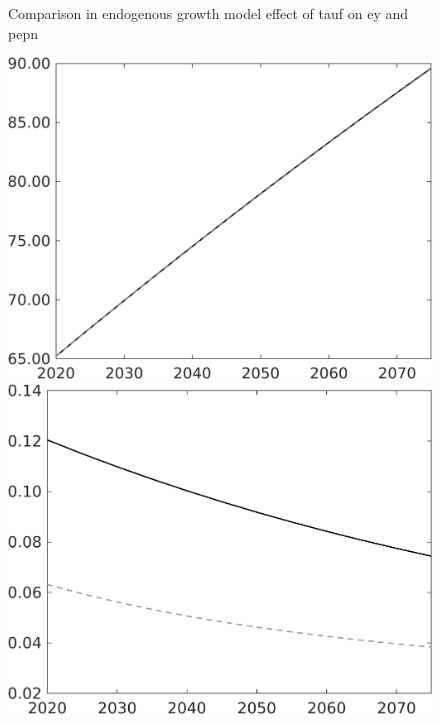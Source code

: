 \documentclass[12pt]{article}
\begin{document}
\begin{figure}{Comparison in endogenous growth model effect of tauf on ey and pepn }
\begin{minipage}[]{0.32\textwidth}
	\end{minipage}
	\begin{minipage}[]{0.32\textwidth}
		\includegraphics[width=1\textwidth]{../../codding_model/own_basedOnFried/optimalPol_010922_revision/figures/all_13Sept22/PerdifNoTauf_regime0_CompTaul_pepn_spillover0_nsk0_xgr0_knspil1_sep0_LFlimit0_emsbase0_countec0_GovRev0_etaa0.79_lgd0.png}
	\end{minipage}
	\begin{minipage}[]{0.32\textwidth}
		\includegraphics[width=1\textwidth]{../../codding_model/own_basedOnFried/optimalPol_010922_revision/figures/all_13Sept22/LevTaufNoTauf_TaulCalib_Equlab_regime0_pepn_spillover0_nsk0_xgr0_knspil1_sep0_LFlimit0_emsbase0_countec0_GovRev0_etaa0.79_lgd0.png}

\end{minipage}
\end{figure}
\end{document}
